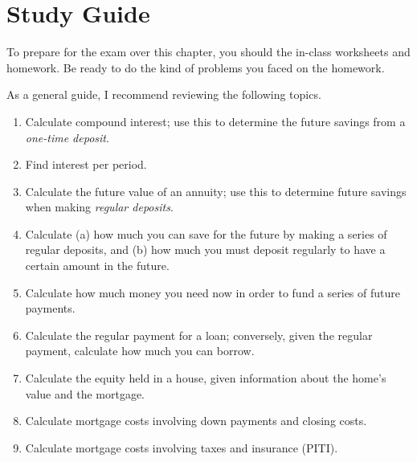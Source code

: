 \section{Study Guide} \label{sec:FinanceStudyGuide}

To prepare for the exam over this chapter,
you should the in-class worksheets and homework.
Be ready to do the kind of problems you faced on the homework.

As a general guide, I recommend reviewing the following topics.

\begin{enumerate}
  \item Calculate compound interest; use this to determine the future savings from a \emph{one-time deposit}.
  \item Find interest per period.
  \item Calculate the future value of an annuity; use this to determine future savings when making \emph{regular deposits}.
  \item Calculate (a) how much you can save for the future by making a series of regular deposits,
        and (b) how much you must deposit regularly to have a certain amount in the future.
  \item Calculate how much money you need now in order to fund a series of future payments.
  \item Calculate the regular payment for a loan;
        conversely, given the regular payment, calculate how much you can borrow.
  \item Calculate the equity held in a house, given information about the home's value and the mortgage.
  \item Calculate mortgage costs involving down payments and closing costs.
  \item Calculate mortgage costs involving taxes and insurance (PITI).
\end{enumerate}

